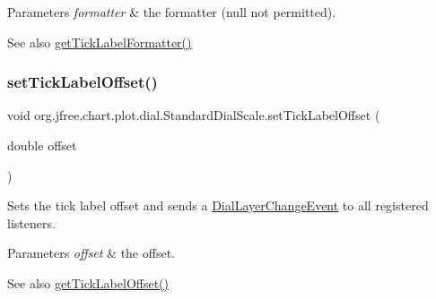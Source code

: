 \begin{DoxyParams}{Parameters}
{\em formatter} & the formatter ({\ttfamily null} not permitted).\\
\hline
\end{DoxyParams}
\begin{DoxySeeAlso}{See also}
\mbox{\hyperlink{classorg_1_1jfree_1_1chart_1_1plot_1_1dial_1_1_standard_dial_scale_a361416a0a85e68c93d457c87ac1e6e28}{get\+Tick\+Label\+Formatter()}} 
\end{DoxySeeAlso}
\mbox{\label{classorg_1_1jfree_1_1chart_1_1plot_1_1dial_1_1_standard_dial_scale_a66505d5c5edc03ab1c77086635fff6c7}} 
\subsubsection{\texorpdfstring{set\+Tick\+Label\+Offset()}{setTickLabelOffset()}}
{\footnotesize\ttfamily void org.\+jfree.\+chart.\+plot.\+dial.\+Standard\+Dial\+Scale.\+set\+Tick\+Label\+Offset (\begin{DoxyParamCaption}\item[{double}]{offset }\end{DoxyParamCaption})}

Sets the tick label offset and sends a \mbox{\hyperlink{classorg_1_1jfree_1_1chart_1_1plot_1_1dial_1_1_dial_layer_change_event}{Dial\+Layer\+Change\+Event}} to all registered listeners.


\begin{DoxyParams}{Parameters}
{\em offset} & the offset.\\
\hline
\end{DoxyParams}
\begin{DoxySeeAlso}{See also}
\mbox{\hyperlink{classorg_1_1jfree_1_1chart_1_1plot_1_1dial_1_1_standard_dial_scale_aec3bd74b6d8c18c65ebcaa9599781091}{get\+Tick\+Label\+Offset()}} 
\end{DoxySeeAlso}
\mbox{\label{classorg_1_1jfree_1_1chart_1_1plot_1_1dial_1_1_standard_dial_scale_a9328a314f07c55da46004bf450bc9627}} 
